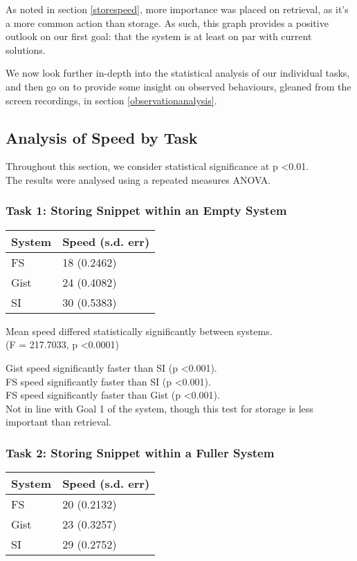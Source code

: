 As noted in section \ref{storespeed}, more importance was placed on retrieval, as it's a more common action than storage.
As such, this graph provides a positive outlook on our first goal: that the system is at least on par with current solutions. 

We now look further in-depth into the statistical analysis of our individual tasks, and then go on to provide some insight on observed behaviours, gleaned from the screen recordings, in section \ref{observationanalysis}.

\subsection{Analysis of Speed by Task}
Throughout this section, we consider statistical significance at p \textless 0.01. \\
The results were analysed using a repeated measures ANOVA.

\subsubsection{Task 1: Storing Snippet within an Empty System}
\begin{table}[H]
\label{speedtabletask1}
\begin{tabular}{ll}
\hline
\textbf{System} & \textbf{Speed (s.d. err)} \\ \hline
FS              & 18 (0.2462)     \\ 
Gist            & 24 (0.4082)     \\ 
SI              & 30 (0.5383)     \\ \hline
\end{tabular}
\end{table}

Mean speed differed statistically significantly between systems. \\
(F = 217.7033, p \textless 0.0001)

Gist speed significantly faster than SI (p \textless 0.001). \\
FS speed significantly faster than SI (p \textless 0.001). \\
FS speed significantly faster than Gist (p \textless 0.001). \\

Not in line with Goal 1 of the system, though this test for storage is less important than retrieval.

\subsubsection{Task 2: Storing Snippet within a Fuller System}
\begin{table}[H]
\label{speedtabletask2}
\begin{tabular}{ll}
\hline
\textbf{System} & \textbf{Speed (s.d. err)} \\ \hline
FS              & 20 (0.2132)     \\ 
Gist            & 23 (0.3257)     \\ 
SI              & 29 (0.2752)     \\ \hline
\end{tabular}
\end{table}

